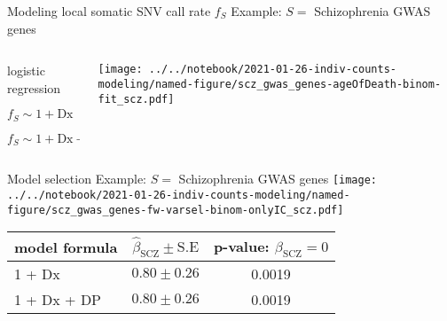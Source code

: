 \documentclass[usenames,dvipsnames]{beamer}
\begin{document}
\begin{frame}{Modeling local somatic SNV call rate $f_S$}
	{Example: $S =$ Schizophrenia GWAS genes}
\begin{columns}[t]
\begin{column}{0.5\textwidth}
\begin{center}
logistic regression
\begin{description}
\tiny
\item[M0] \(f_S \sim 1 + \mathrm{Dx}\)
\item[M1] \(f_S \sim 1 + \mathrm{Dx} + \mathrm{ageOfDeath}\)
\end{description}
\end{center}
\end{column}

\begin{column}{0.5\textwidth}

\texttt{[image: ../../notebook/2021-01-26-indiv-counts-modeling/named-figure/scz\_gwas\_genes-ageOfDeath-binom-fit\_scz.pdf]}
\end{column}
\end{columns}
\end{frame}

\begin{frame}{Model selection}
	{Example: $S =$ Schizophrenia GWAS genes}
\small
\texttt{[image: ../../notebook/2021-01-26-indiv-counts-modeling/named-figure/scz\_gwas\_genes-fw-varsel-binom-onlyIC\_scz.pdf]}

\begin{center}
\tiny
\begin{tabular}{l|cc}
model formula & \(\hat{\beta}_\mathrm{SCZ} \pm \mathrm{S.E}\) & p-value: \(\beta_\mathrm{SCZ} = 0\) \\
\hline
1 + Dx & \(0.80 \pm 0.26\) & 0.0019 \\
1 + Dx + DP & \(0.80 \pm 0.26\) & 0.0019 \\
\end{tabular}
\end{center}
\end{frame}
\end{document}
